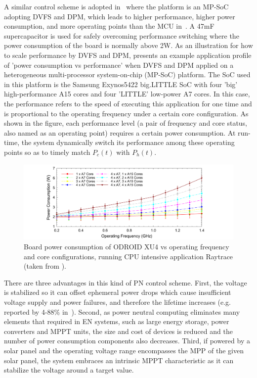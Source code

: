 A similar control scheme is adopted in~\cite{fletcher2017power} where the platform is an MP-SoC adopting DVFS and DPM, which leads to higher performance, higher power consumption, and more operating points than the MCU in~\cite{balsamo2016graceful}. A 47mF supercapacitor is used for safely overcoming performance switching where the power consumption of the board is normally above 2W. As an illustration for how to scale performance by DVFS and DPM,  presents an example application profile of 'power consumption vs performance' when DVFS and DPM applied on a heterogeneous multi-processor system-on-chip (MP-SoC) platform. The SoC used in this platform is the Samsung Exynos5422 big.LITTLE SoC with four 'big' high-performance A15 cores and four 'LITTLE' low-power A7 cores. In this case, the performance refers to the speed of executing this application for one time and is proportional to the operating frequency under a certain core configuration. As shown in the figure, each performance level (a pair of frequency and core status, also named as an operating point) requires a certain power consumption. At run-time, the system dynamically switch its performance among these operating points so as to timely match $P_c(t)$ with $P_h(t)$.

\begin{figure}[!htb]
    \centering
    \includegraphics[width=14cm]{ch2_review/figures/dvfs}
    \caption{Board power consumption of ODROID XU4 vs operating frequency and core configurations, running CPU intensive application Raytrace (taken from \cite{fletcher2017power}).}
    \label{Figure:dvfs}
\end{figure}

There are three advantages in this kind of PN control scheme. First, the voltage is stabilized so it can offset ephemeral power drops which cause insufficient voltage supply and power failures, and therefore the lifetime increases (e.g. reported by 4-88\% in~\cite{balsamo2016graceful}). Second, as power neutral computing eliminates many elements that required in EN systems, such as large energy storage, power converters and MPPT units, the size and cost of devices is reduced and the number of power consumption components also decreases. Third, if powered by a solar panel and the operating voltage range encompasses the MPP of the given solar panel, the system embraces an intrinsic MPPT characteristic as it can stabilize the voltage around a target value.

